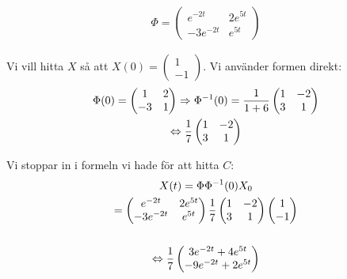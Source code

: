 \begin{equation*}
  \begin{gathered}
    \Phi = \begin{pmatrix}e^{-2t}&2e^{5t}\\-3e^{-2t}&e^{5t}\end{pmatrix}
  \end{gathered}
\end{equation*}\par
\noindent Vi vill hitta $X$ så att $X(0) = \begin{pmatrix}1\\-1\end{pmatrix}$. Vi använder formen direkt:
\begin{equation*}
  \begin{gathered}
    \Phi(0) = \begin{pmatrix}1&2\\-3&1\end{pmatrix}\Rightarrow\Phi^{-1}(0) = \dfrac{1}{1+6}\begin{pmatrix}1&-2\\3&1\end{pmatrix}\\
    \Leftrightarrow \dfrac{1}{7}\begin{pmatrix}1&-2\\3&1\end{pmatrix}
  \end{gathered}
\end{equation*}\par
\noindent Vi stoppar in i formeln vi hade för att hitta $C$:
\begin{equation*}
  \begin{gathered}
    X(t) = \Phi\Phi^{-1}(0)X_0\\
    = \begin{pmatrix}e^{-2t}&2e^{5t}\\-3e^{-2t}&e^{5t}\end{pmatrix}\dfrac{1}{7}\begin{pmatrix}1&-2\\3&1\end{pmatrix}\begin{pmatrix}1\\-1\end{pmatrix}\\\\
    \Leftrightarrow\dfrac{1}{7}\begin{pmatrix}3e^{-2t}+4e^{5t}\\-9e^{-2t}+2e^{5t}\end{pmatrix}
  \end{gathered}
\end{equation*}
